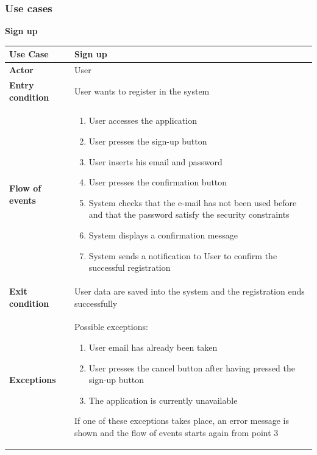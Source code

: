 \documentclass[../RASD.tex]{subfiles}
\begin{document}
    \subsubsection{Use cases}
    \textbf{Sign up}
        \begin{table}[H]
            \begin{center}
                \begin{tabular}{|m{10em}|m{30em}|}
                \hline
                \textbf{Use Case} & Sign up\\
                \hline
                \textbf{Actor} & User\\
                \hline
                \textbf{Entry condition} & User wants to register in the system\\
                \hline
                \textbf{Flow of events} & 
                    \begin{enumerate}
                        \item User accesses the application
                        \item User presses the sign-up button
                        \item User inserts his email and password
                        \item User presses the confirmation button
                        \item System checks that the e-mail has not been used before and that the password satisfy the security constraints
                        \item System displays a confirmation message
                        \item System sends a notification to User to confirm the successful registration
                    \end{enumerate}\\
                \hline
                \textbf{Exit condition} & User data are saved into the system and the registration ends successfully\\
                \hline
                \textbf{Exceptions} &
                Possible exceptions:
                \begin{enumerate}
                    \item User email has already been taken
                    \item User presses the cancel button after having pressed the sign-up button
                    \item The application is currently unavailable
                \end{enumerate}
                If one of these exceptions takes place, an error message is shown and the flow of events starts again from point 3\\
                \hline
                \end{tabular}
            \end{center}
        \end{table}\newpage
\end{document}
